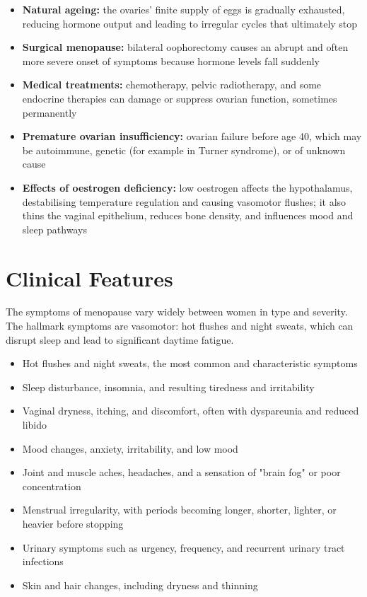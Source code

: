 \begin{itemize}
    \item \textbf{Natural ageing:} the ovaries' finite supply of eggs is gradually exhausted, reducing hormone output and leading to irregular cycles that ultimately stop
    \item \textbf{Surgical menopause:} bilateral oophorectomy causes an abrupt and often more severe onset of symptoms because hormone levels fall suddenly
    \item \textbf{Medical treatments:} chemotherapy, pelvic radiotherapy, and some endocrine therapies can damage or suppress ovarian function, sometimes permanently
    \item \textbf{Premature ovarian insufficiency:} ovarian failure before age 40, which may be autoimmune, genetic (for example in Turner syndrome), or of unknown cause
    \item \textbf{Effects of oestrogen deficiency:} low oestrogen affects the hypothalamus, destabilising temperature regulation and causing vasomotor flushes; it also thins the vaginal epithelium, reduces bone density, and influences mood and sleep pathways
\end{itemize}

\section*{Clinical Features}
The symptoms of menopause vary widely between women in type and severity. The hallmark symptoms are vasomotor: hot flushes and night sweats, which can disrupt sleep and lead to significant daytime fatigue.

\begin{itemize}
    \item Hot flushes and night sweats, the most common and characteristic symptoms
    \item Sleep disturbance, insomnia, and resulting tiredness and irritability
    \item Vaginal dryness, itching, and discomfort, often with dyspareunia and reduced libido
    \item Mood changes, anxiety, irritability, and low mood
    \item Joint and muscle aches, headaches, and a sensation of "brain fog" or poor concentration
    \item Menstrual irregularity, with periods becoming longer, shorter, lighter, or heavier before stopping
    \item Urinary symptoms such as urgency, frequency, and recurrent urinary tract infections
    \item Skin and hair changes, including dryness and thinning
\end{itemize}

